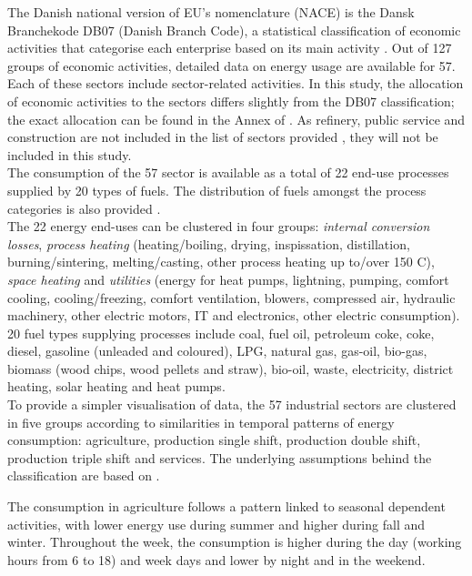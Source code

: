 \documentclass[review]{elsarticle}
\begin{document}
The Danish national version of EU's nomenclature (NACE) is the Dansk Branchekode DB07 (Danish Branch Code), a statistical classification of economic activities that categorise each enterprise based on its main activity \cite{DanmarksStatistik2013}. 
Out of 127 groups of economic activities, detailed data on energy usage are available for 57. Each of these sectors include sector-related activities. In this study, the allocation of economic activities to the sectors differs slightly from the DB07 classification; the exact allocation can be found in the Annex of \cite{VM2015}. As refinery, public service and construction are not included in the list of sectors provided \cite{VM2015}, they will not be included in this study.
\\
The consumption of the 57 sector is available as a total of 22 end-use processes supplied by 20 types of fuels. The distribution of fuels amongst the process categories is also provided \cite{VM2015}.
\\
The 22 energy end-uses can be clustered in four groups: \textit{internal conversion losses}, \textit{process heating} (heating/boiling, drying, inspissation, distillation, burning/sintering, melting/casting, other process heating up to/over 150 C), \textit{space heating} and \textit{utilities} (energy for heat pumps, lightning, pumping, comfort cooling, cooling/freezing, comfort ventilation, blowers, compressed air, hydraulic machinery, other electric motors, IT and electronics, other electric consumption).
\\
20 fuel types supplying processes include coal, fuel oil, petroleum coke, coke, diesel, gasoline (unleaded and coloured), LPG, natural gas, gas-oil, bio-gas, biomass (wood chips, wood pellets and straw), bio-oil, waste, electricity, district heating, solar heating and heat pumps.
\\
To provide a simpler visualisation of data, the 57 industrial sectors are clustered in five groups according to similarities in temporal patterns of energy consumption: agriculture, production single shift, production double shift, production triple shift and services. The underlying assumptions behind the classification are based on \cite{VM2016,Wiese2017}.  

The consumption in agriculture follows a pattern linked to seasonal dependent activities, with lower energy use during summer and higher during fall and winter. Throughout the week, the consumption is higher during the day (working hours from 6 to 18) and week days and lower by night and in the weekend.
\end{document}
